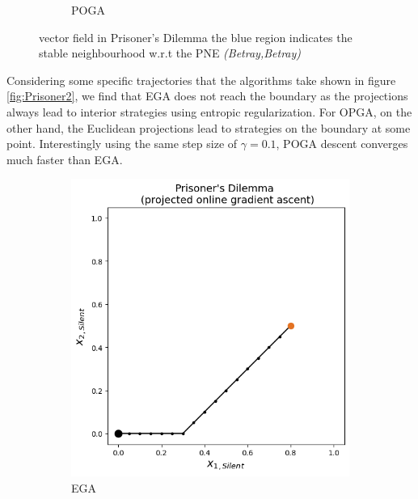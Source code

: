 \begin{figure}[H]
\begin{subfigure}{.5\textwidth}
    \caption{POGA}
\end{subfigure}
\caption{vector field in Prisoner's Dilemma the blue region indicates the stable neighbourhood w.r.t the PNE \textit{(Betray,Betray)}}
\label{fig:Prisoner}
\end{figure}

Considering some specific trajectories that the algorithms take shown in figure \ref{fig:Prisoner2}, we find that EGA does not reach the boundary as the projections always lead to interior strategies using entropic regularization. For OPGA, on the other hand, the Euclidean projections lead to strategies on the boundary at some point. Interestingly using the same step size of $\gamma = 0.1$, POGA descent converges much faster than EGA. 

\begin{figure}[H]
\captionsetup{justification=centering}
\centering
\begin{subfigure}{.5\textwidth}
    \centering
    \includegraphics[width=\textwidth]{logos/Prisoner4.png}
    \caption{EGA}
\end{subfigure}%
\begin{subfigure}{.5\textwidth}
    \centering

\end{subfigure}
\end{figure}
